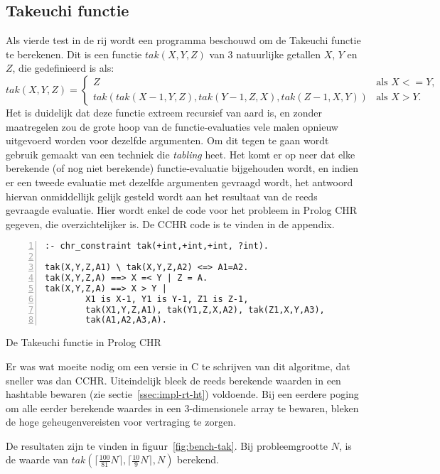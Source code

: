 \subsection{Takeuchi functie} \label{sec:bench-tak}

Als vierde test in de rij wordt een programma beschouwd om de Takeuchi functie te berekenen. Dit is een functie $tak(X,Y,Z)$ van 3 natuurlijke getallen $X$, $Y$ en $Z$, die gedefinieerd is als:
\begin{equation*}
tak(X,Y,Z) = 
\begin{cases} 
  Z & \text{als $X <= Y$,} \\
  tak(tak(X-1,Y,Z),tak(Y-1,Z,X),tak(Z-1,X,Y)) & \text{als $X > Y$.}
\end{cases}
\end{equation*}
Het is duidelijk dat deze functie extreem recursief van aard is, en zonder maatregelen zou de grote hoop van de functie-evaluaties vele malen opnieuw uitgevoerd worden voor dezelfde argumenten. Om dit tegen te gaan wordt gebruik gemaakt van een techniek die {\em tabling} heet. Het komt er op neer dat elke berekende (of nog niet berekende) functie-evaluatie bijgehouden wordt, en indien er een tweede evaluatie met dezelfde argumenten gevraagd wordt, het antwoord hiervan onmiddellijk gelijk gesteld wordt aan het resultaat van de reeds gevraagde evaluatie. Hier wordt enkel de code voor het probleem in Prolog CHR gegeven, die overzichtelijker is. De CCHR code is te vinden in de appendix.
\begin{exCode}
\begin{Verbatim}[frame=single,numbers=left]
:- chr_constraint tak(+int,+int,+int, ?int).

tak(X,Y,Z,A1) \ tak(X,Y,Z,A2) <=> A1=A2.
tak(X,Y,Z,A) ==> X =< Y | Z = A.
tak(X,Y,Z,A) ==> X > Y | 
        X1 is X-1, Y1 is Y-1, Z1 is Z-1,
        tak(X1,Y,Z,A1), tak(Y1,Z,X,A2), tak(Z1,X,Y,A3),
        tak(A1,A2,A3,A).
\end{Verbatim}
\caption{\label{code:tak} De Takeuchi functie in Prolog CHR}
\end{exCode}
Er was wat moeite nodig om een versie in C te schrijven van dit algoritme, dat sneller was dan CCHR. Uiteindelijk bleek de reeds berekende waarden in een hashtable bewaren (zie sectie~\ref{ssec:impl-rt-ht}) voldoende. Bij een eerdere poging om alle eerder berekende waardes in een 3-dimensionele array te bewaren, bleken de hoge geheugenvereisten voor vertraging te zorgen.

De resultaten zijn te vinden in figuur~\ref{fig:bench-tak}. Bij probleemgrootte $N$, is de waarde van $tak(\lceil\frac{100}{81}N\rceil,\lceil\frac{10}{9}N\rceil,N)$ berekend.


